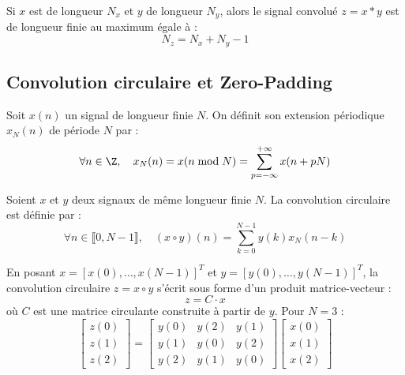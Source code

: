 \begin{proposition}
    Si $x$ est de longueur $N_x$ et $y$ de longueur $N_y$, alors le signal convolué $z = x * y$ est de longueur finie au maximum égale à :
    \begin{equation}
        N_z = N_x + N_y - 1
    \end{equation}
\end{proposition}

\subsection{Convolution circulaire et Zero-Padding}

\begin{definition}
    Soit $x(n)$ un signal de longueur finie $N$. On définit son extension périodique $x_N(n)$ de période $N$ par : 
        \begin{equation} 
            \forall n \in \Z, \quad x_N(n) = x(n \bmod N) = \sum_{p=-\infty}^{+\infty} x(n + pN)
        \end{equation}
\end{definition}

\begin{definition}
    Soient $x$ et $y$ deux signaux de même longueur finie $N$. La convolution circulaire est définie par : 
        \begin{equation}
            \boxed{\forall n \in \llbracket 0, N-1 \rrbracket, \quad (x \circ y)(n) = \sum_{k=0}^{N-1} y(k) x_N(n - k)}
        \end{equation}
\end{definition}

\begin{proposition}
    En posant $x = [x(0), \dots, x(N-1)]^T$ et $y = [y(0), \dots, y(N-1)]^T$, la convolution circulaire $z = x \circ y$ s'écrit sous forme d'un produit matrice-vecteur :
    \begin{equation}
        z = C \cdot x
    \end{equation}
    où $C$ est une matrice circulante construite à partir de $y$. Pour $N = 3$ :
    $$
    \begin{bmatrix} z(0) \\ z(1) \\ z(2) \end{bmatrix} = 
    \begin{bmatrix} 
        y(0) & y(2) & y(1) \\ 
        y(1) & y(0) & y(2) \\ 
        y(2) & y(1) & y(0) 
    \end{bmatrix}
    \begin{bmatrix} x(0) \\ x(1) \\ x(2) \end{bmatrix}
    $$
\end{proposition}

